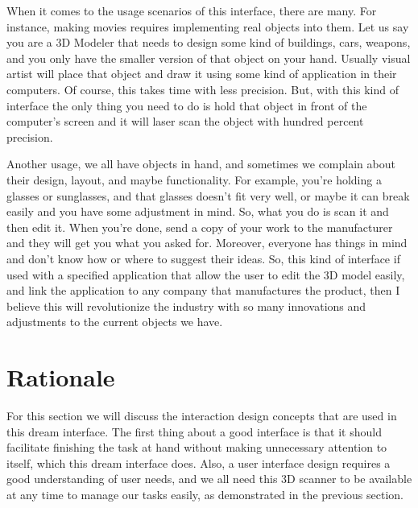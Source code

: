 \documentclass[12pt, oneside]{amsart}   	%
\begin{document}
When it comes to the usage scenarios of this interface, there are many.  For instance, making movies requires implementing real objects into them. Let us say you are a 3D Modeler that needs to design some kind of buildings, cars, weapons, and you only have the smaller version of that object on your hand. Usually visual artist will place that object and draw it using some kind of application in their computers. Of course, this takes time with less precision.  But, with this kind of interface the only thing you need to do is hold that object in front of the computer's screen and it will laser scan the object with hundred percent precision.  

Another usage, we all have objects in hand, and sometimes we complain about their design, layout, and maybe functionality. For example, you're holding a glasses or sunglasses, and that glasses doesn't fit very well, or maybe it can break easily and you have some adjustment in mind. So, what you do is scan it and then edit it.  When you're done, send a copy of your work to the manufacturer and they will get you what you asked for.  Moreover, everyone has things in mind and don't know how or where to suggest their ideas.  So, this kind of interface if used with a specified application that allow the user to edit the 3D model easily, and link the application to any company that manufactures the product, then I believe this will revolutionize the industry with so many innovations and adjustments to the current objects we have.  

\section{Rationale}

For this section we will discuss the interaction design concepts that are used in this dream interface. The first thing about a good interface is that it should facilitate finishing the task at hand without making unnecessary attention to itself, which this dream interface does. Also, a user interface design requires a good understanding of user needs, and we all need this 3D scanner to be available at any time to manage our tasks easily, as demonstrated in the previous section. 
\end{document}
